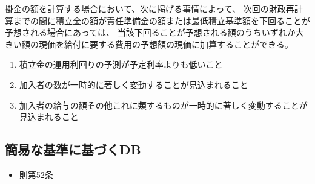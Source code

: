 \begin{answerbox}
  掛金の額を計算する場合において、次に掲げる事情によって、
  次回の財政再計算までの間に積立金の額が責任準備金の額または最低積立基準額を下回ることが予想される場合にあっては、
  当該下回ることが予想される額のうちいずれか大きい額の現価を給付に要する費用の予想額の現価に加算することができる。
  \begin{enumerate}
    \item 積立金の運用利回りの予測が予定利率よりも低いこと
    \item 加入者の数が一時的に著しく変動することが見込まれること
    \item 加入者の給与の額その他これに類するものが一時的に著しく変動することが見込まれること
  \end{enumerate}
\end{answerbox}

\newpage

\subsection{簡易な基準に基づくDB}

\begin{InyouJobunbox}
  \begin{itemize}
    \item 則第52条
  \end{itemize}
\end{InyouJobunbox}


